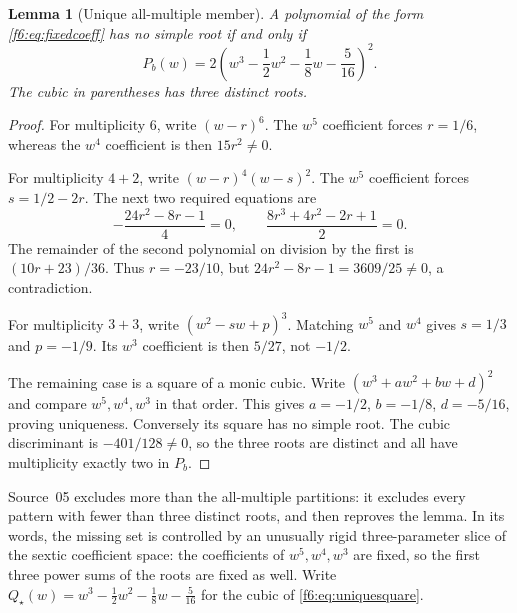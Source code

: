 \documentclass[11pt,a4paper]{article}
\newtheorem{lemma}[theorem]{Lemma}
\theoremstyle{definition}
\begin{document}
\begin{lemma}[Unique all-multiple member]\label{f6:lem:square}
A polynomial of the form \eqref{f6:eq:fixedcoeff} has no simple root if and
only if
\begin{equation}\label{f6:eq:uniquesquare}
 P_b(w)=2\left(w^3-\frac12w^2-\frac18w-\frac5{16}\right)^2.
\end{equation}
The cubic in parentheses has three distinct roots.
\end{lemma}
\begin{proof}
For multiplicity $6$, write $(w-r)^6$. The $w^5$ coefficient forces
$r=1/6$, whereas the $w^4$ coefficient is then $15r^2\ne0$.

For multiplicity $4+2$, write $(w-r)^4(w-s)^2$. The $w^5$ coefficient
forces $s=1/2-2r$. The next two required equations are
\[
 -\frac{24r^2-8r-1}{4}=0,
 \qquad \frac{8r^3+4r^2-2r+1}{2}=0.
\]
The remainder of the second polynomial on division by the first is
$(10r+23)/36$. Thus $r=-23/10$, but
$24r^2-8r-1=3609/25\ne0$, a contradiction.

For multiplicity $3+3$, write $(w^2-sw+p)^3$. Matching $w^5$ and $w^4$
gives $s=1/3$ and $p=-1/9$. Its $w^3$ coefficient is then $5/27$, not
$-1/2$.

The remaining case is a square of a monic cubic. Write
$(w^3+aw^2+bw+d)^2$ and compare $w^5,w^4,w^3$ in that order. This gives
$a=-1/2$, $b=-1/8$, $d=-5/16$, proving uniqueness. Conversely its square
has no simple root. The cubic discriminant is $-401/128\ne0$, so the
three roots are distinct and all have multiplicity exactly two in $P_b$.
\end{proof}

Source~05 excludes more than the all-multiple partitions: it excludes every
pattern with fewer than three distinct roots, and then reproves the lemma.
In its words, the missing set is controlled by an unusually rigid
three-parameter slice of the sextic coefficient space: the coefficients of
$w^5,w^4,w^3$ are fixed, so the first three power sums of the roots are fixed
as well. Write $Q_\star(w)=w^3-\frac12w^2-\frac18w-\frac5{16}$ for the cubic
of \eqref{f6:eq:uniquesquare}.
\end{document}

